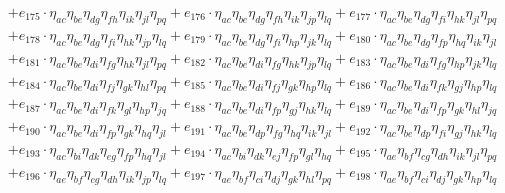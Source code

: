 \begin{itemize}
\begin{align}
    & + e_{175} \cdot \eta_{a c} \eta_{b e} \eta_{d g} \eta_{f h} \eta_{i k} \eta_{j l} \eta_{p q} + e_{176} \cdot \eta_{a c} \eta_{b e} \eta_{d g} \eta_{f h} \eta_{i k} \eta_{j p} \eta_{l q} + e_{177} \cdot \eta_{a c} \eta_{b e} \eta_{d g} \eta_{f i} \eta_{h k} \eta_{j l} \eta_{p q} \nonumber \\
    & + e_{178} \cdot \eta_{a c} \eta_{b e} \eta_{d g} \eta_{f i} \eta_{h k} \eta_{j p} \eta_{l q} + e_{179} \cdot \eta_{a c} \eta_{b e} \eta_{d g} \eta_{f i} \eta_{h p} \eta_{j k} \eta_{l q} + e_{180} \cdot \eta_{a c} \eta_{b e} \eta_{d g} \eta_{f p} \eta_{h q} \eta_{i k} \eta_{j l} \nonumber \\
    & + e_{181} \cdot \eta_{a c} \eta_{b e} \eta_{d i} \eta_{f g} \eta_{h k} \eta_{j l} \eta_{p q} + e_{182} \cdot \eta_{a c} \eta_{b e} \eta_{d i} \eta_{f g} \eta_{h k} \eta_{j p} \eta_{l q} + e_{183} \cdot \eta_{a c} \eta_{b e} \eta_{d i} \eta_{f g} \eta_{h p} \eta_{j k} \eta_{l q} \nonumber \\
    & + e_{184} \cdot \eta_{a c} \eta_{b e} \eta_{d i} \eta_{f j} \eta_{g k} \eta_{h l} \eta_{p q} + e_{185} \cdot \eta_{a c} \eta_{b e} \eta_{d i} \eta_{f j} \eta_{g k} \eta_{h p} \eta_{l q} + e_{186} \cdot \eta_{a c} \eta_{b e} \eta_{d i} \eta_{f k} \eta_{g j} \eta_{h p} \eta_{l q} \nonumber \\
    & + e_{187} \cdot \eta_{a c} \eta_{b e} \eta_{d i} \eta_{f k} \eta_{g l} \eta_{h p} \eta_{j q} + e_{188} \cdot \eta_{a c} \eta_{b e} \eta_{d i} \eta_{f p} \eta_{g j} \eta_{h k} \eta_{l q} + e_{189} \cdot \eta_{a c} \eta_{b e} \eta_{d i} \eta_{f p} \eta_{g k} \eta_{h l} \eta_{j q} \nonumber \\
    & + e_{190} \cdot \eta_{a c} \eta_{b e} \eta_{d i} \eta_{f p} \eta_{g k} \eta_{h q} \eta_{j l} + e_{191} \cdot \eta_{a c} \eta_{b e} \eta_{d p} \eta_{f g} \eta_{h q} \eta_{i k} \eta_{j l} + e_{192} \cdot \eta_{a c} \eta_{b e} \eta_{d p} \eta_{f i} \eta_{g j} \eta_{h k} \eta_{l q} \nonumber \\
    & + e_{193} \cdot \eta_{a c} \eta_{b i} \eta_{d k} \eta_{e g} \eta_{f p} \eta_{h q} \eta_{j l} + e_{194} \cdot \eta_{a c} \eta_{b i} \eta_{d k} \eta_{e j} \eta_{f p} \eta_{g l} \eta_{h q} + e_{195} \cdot \eta_{a e} \eta_{b f} \eta_{c g} \eta_{d h} \eta_{i k} \eta_{j l} \eta_{p q} \nonumber \\
    & + e_{196} \cdot \eta_{a e} \eta_{b f} \eta_{c g} \eta_{d h} \eta_{i k} \eta_{j p} \eta_{l q} + e_{197} \cdot \eta_{a e} \eta_{b f} \eta_{c i} \eta_{d j} \eta_{g k} \eta_{h l} \eta_{p q} + e_{198} \cdot \eta_{a e} \eta_{b f} \eta_{c i} \eta_{d j} \eta_{g k} \eta_{h p} \eta_{l q} \nonumber \\

\end{align}
\end{itemize}
